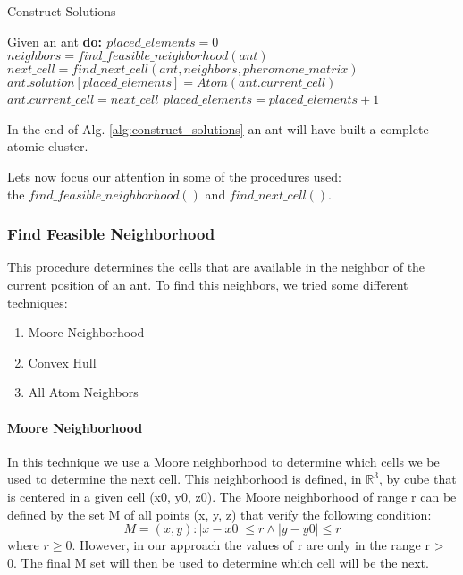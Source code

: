 	\begin{algorithm}
		\caption{Construct Solutions}
		\label{alg:construct_solutions}
		\begin{algorithmic}
		\STATE Given an ant \bf{do}:
		\STATE $placed\_elements = 0$
			\STATE $neighbors = find\_feasible\_neighborhood(ant)$
			\STATE $next\_cell = find\_next\_cell(ant, neighbors, pheromone\_matrix)$
			\STATE $ant.solution[placed\_elements] = Atom(ant.current\_cell)$
			\STATE $ant.current\_cell = next\_cell$
			\STATE $placed\_elements = placed\_elements + 1$			
		\ENDWHILE
		\end{algorithmic}
	\end{algorithm}
	
	In the end of Alg. \ref{alg:construct_solutions} an ant will have built a complete atomic cluster.
	
	Lets now focus our attention in some of the procedures used:\\ the $find\_feasible\_neighborhood()$ and $find\_next\_cell()$. 
	
		\subsubsection*{Find Feasible Neighborhood}
		This procedure determines the cells that are available in the neighbor of the current position of an ant. To find this neighbors, we tried some different techniques:
		\begin{enumerate}
			\item Moore Neighborhood
			\item Convex Hull
			\item All Atom Neighbors
		\end{enumerate}
	
		\paragraph*{Moore Neighborhood}
			
			In this technique we use a Moore neighborhood to determine which cells we be used to determine the next cell. 
			This neighborhood is defined, in $\mathbb{R}^3$, by cube that is centered in a given cell (x0, y0, z0). The Moore neighborhood of range r can be defined by the set M of all points (x, y, z) that verify the following condition:
			\begin{equation}
				M= {(x,y):|x-x0| \leq r \wedge |y-y0| \leq r}
			\end{equation}
			where $r \geq 0$. However, in our approach the values of r are only in the range r > 0.
			The final M set will then be used to determine which cell will be the next.
